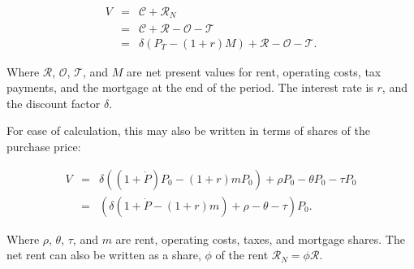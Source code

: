 \begin{eqnarray}
V &=& \mathcal{C} + \mathcal{R}_N \nonumber \\
  &=& \mathcal{C} + \mathcal{R} - \mathcal{O} - \mathcal{T} \nonumber \\
  &=& \delta \left(P_T- \left(1+r\right)M\right) + \mathcal{R} - \mathcal{O} - \mathcal{T}.
\label{eqn-property-investment-value1}
\end{eqnarray}


 Where $\mathcal{R}$, $\mathcal{O}$, $\mathcal{T}$, and $M$ are  net present values for rent, operating costs, tax payments, and the mortgage at the end of the period. The interest rate is $r$, and the discount factor $\delta$.

 For ease of calculation, this may also be written in terms of shares of the purchase price:

\begin{eqnarray}
V &=& \delta \left((1+\dot P) P_0 - (1+r)mP_0\right) + \rho P_0 - \theta P_0 - \tau P_0 \nonumber \\
  &=& \left(\delta \left(1+\dot P - (1+r)m   \right) + \rho     - \theta     - \tau\right) P_0.
\label{eqn-property-investment-value2}
\end{eqnarray}
 
 Where $\rho$, $\theta$, $\tau$, and $m$ are rent, operating costs, taxes, and mortgage shares. The net rent can also be written as a share, $\phi$ of the rent $\mathcal{R}_N = \phi \mathcal{R}$. %

